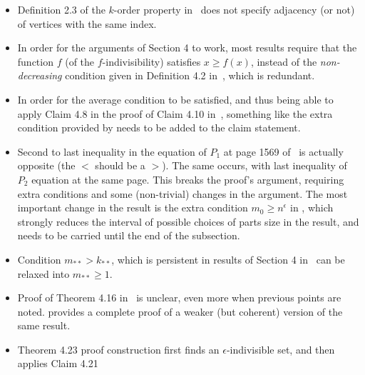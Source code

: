     \begin{itemize}
        \item Definition 2.3 of the $k$-order property in~\cite{regularity_lemmas_for_stable_graphs} does not
            specify adjacency (or not) of vertices with the same index.
        \item In order for the arguments of Section 4 to work, most results require that the function
            $f$ (of the $f$-indivisibility) satisfies $x \geq f(x)$, instead of the \emph{non-decreasing} condition
            given in Definition 4.2 in~\cite{regularity_lemmas_for_stable_graphs}, which is redundant.
        \item In order for the average condition to be satisfied, and thus being able to apply Claim 4.8 in the proof
            of Claim 4.10 in~\cite{regularity_lemmas_for_stable_graphs}, something like the extra condition provided
            by  needs to be added to the claim statement.
        \item Second to last inequality in the equation of $P_1$ at page 1569 of~\cite{regularity_lemmas_for_stable_graphs}
            is actually opposite (the $<$ should be a $>$).
            The same occurs, with last inequality of $P_2$ equation at the same page.
            This breaks the proof's argument, requiring extra conditions and some (non-trivial) changes in the argument.
            The most important change in the result is the extra condition $m_0 \geq n^\epsilon$ in
            , which strongly reduces the
            interval of possible choices of parts size in the result, and needs to be carried until the end of the subsection.
        \item Condition $m_{**} > k_{**}$, which is persistent in results of Section 4
            in~\cite{regularity_lemmas_for_stable_graphs} can be relaxed into $m_{**} \geq 1$.
        \item Proof of Theorem 4.16 in~\cite{regularity_lemmas_for_stable_graphs} is unclear, even more when previous points
            are noted.
             provides
            a complete proof of a weaker (but coherent) version of the same result.
        \item Theorem 4.23 proof construction first finds an $\epsilon$-indivisible set, and then applies Claim 4.21

\end{itemize}
